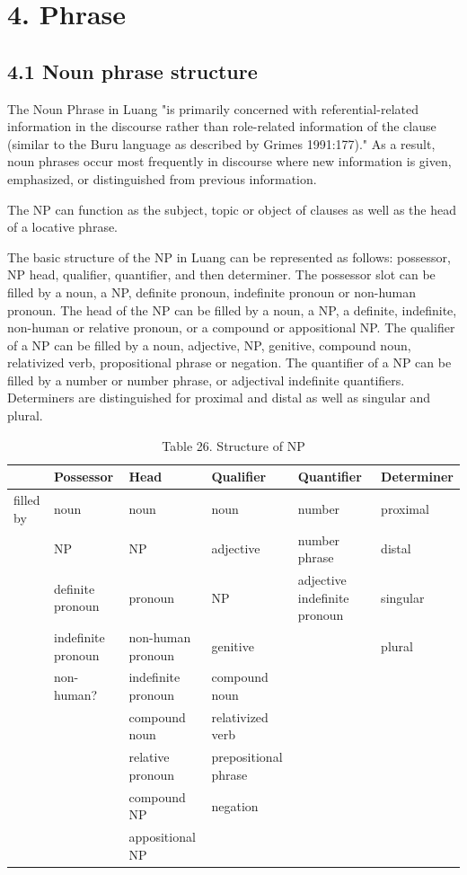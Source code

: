 \documentclass[10pt]{article}
\begin{document}
\section*{4. Phrase}
\subsection*{4.1 Noun phrase structure}
The Noun Phrase in Luang "is primarily concerned with referential-related information in the discourse rather than role-related information of the clause (similar to the Buru language as described by Grimes 1991:177)." As a result, noun phrases occur most frequently in discourse where new information is given, emphasized, or distinguished from previous information.

The NP can function as the subject, topic or object of clauses as well as the head of a locative phrase.

The basic structure of the NP in Luang can be represented as follows: possessor, NP head, qualifier, quantifier, and then determiner. The possessor slot can be filled by a noun, a NP, definite pronoun, indefinite pronoun or non-human pronoun. The head of the NP can be filled by a noun, a NP, a definite, indefinite, non-human or relative pronoun, or a compound or appositional NP. The qualifier of a NP can be filled by a noun, adjective, NP, genitive, compound noun, relativized verb, propositional phrase or negation. The quantifier of a NP can be filled by a number or number phrase, or adjectival indefinite quantifiers. Determiners are distinguished for proximal and distal as well as singular and plural.

\begin{table}[h]
\begin{center}
\captionsetup{labelformat=empty}
\caption{Table 26. Structure of NP}
\begin{tabular}{|l|l|l|l|l|l|}
\hline
 & Possessor & Head & Qualifier & Quantifier & Determiner \\
\hline
filled by & noun & noun & noun & number & proximal \\
\hline
 & NP & NP & adjective & number phrase & distal \\
\hline
 & definite pronoun & pronoun & NP & adjective indefinite pronoun & singular \\
\hline
 & indefinite pronoun & non-human pronoun & genitive &  & plural \\
\hline
 & non-human? & indefinite pronoun & compound noun &  &  \\
\hline
 &  & compound noun & relativized verb &  &  \\
\hline
 &  & relative pronoun & prepositional phrase &  &  \\
\hline
 &  & compound NP & negation &  &  \\
\hline
 &  & appositional NP &  &  &  \\
\hline
\end{tabular}
\end{center}
\end{table}
\end{document}

